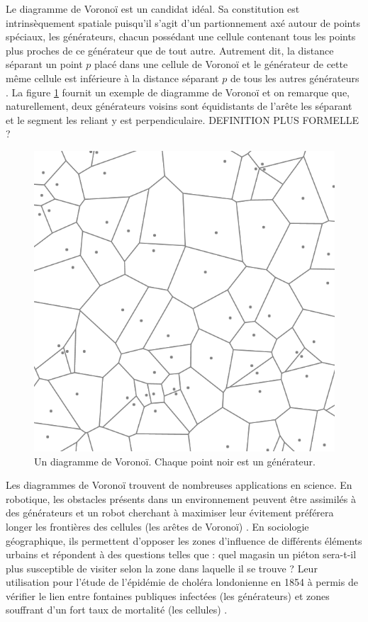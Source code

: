 \documentclass[12pt]{article}
\begin{document}
Le diagramme de Voronoï est un candidat idéal. Sa constitution est
intrinsèquement spatiale puisqu'il s'agit d'un partionnement axé
autour de points spéciaux, les générateurs, chacun possédant une
cellule contenant tous les points plus proches de ce générateur que de
tout autre. Autrement dit, la distance séparant un point $p$ placé
dans une cellule de Voronoï et le générateur de cette même cellule est
inférieure à la distance séparant $p$ de tous les autres générateurs
\cite{Edwards1993}. La figure \ref{fig:voronoi} fournit un exemple de
diagramme de Voronoï et on remarque que, naturellement, deux
générateurs voisins sont équidistants de l'arête les séparant et le
segment les reliant y est perpendiculaire. DEFINITION PLUS FORMELLE ?

\begin{figure}[!ht]
  \centering
  \includegraphics[width=0.5\linewidth]{images/voronoi.png}
  \caption{Un diagramme de Voronoï. Chaque point noir est un générateur.}
  \label{fig:voronoi}
\end{figure}

Les diagrammes de Voronoï trouvent de nombreuses applications en
science. En robotique, les obstacles présents dans un environnement
peuvent être assimilés à des générateurs et un robot cherchant à
maximiser leur évitement préférera longer les frontières des cellules
(les arêtes de Voronoï) \cite{Garrido2006}. En sociologie
géographique, ils permettent d'opposer les zones d'influence de
différents éléments urbains et répondent à des questions telles que :
quel magasin un piéton sera-t-il plus susceptible de visiter selon la
zone dans laquelle il se trouve ? Leur utilisation pour l'étude de
l'épidémie de choléra londonienne en 1854 à permis de vérifier le lien
entre fontaines publiques infectées (les générateurs) et zones
souffrant d'un fort taux de mortalité (les cellules)
\cite{Thomas2010}.
\end{document}
